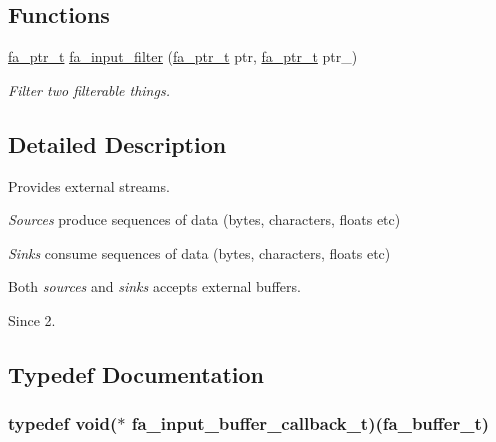 \subsection*{Functions}
\begin{DoxyCompactItemize}
\item 
\hyperlink{group___fa_ga915ddeae99ad7568b273d2b876425197}{fa\-\_\-ptr\-\_\-t} \hyperlink{group___fa_input_ga37bc671f36c95f15fba9aac955990e5e}{fa\-\_\-input\-\_\-filter} (\hyperlink{group___fa_ga915ddeae99ad7568b273d2b876425197}{fa\-\_\-ptr\-\_\-t} ptr, \hyperlink{group___fa_ga915ddeae99ad7568b273d2b876425197}{fa\-\_\-ptr\-\_\-t} ptr\-\_\-)
\begin{DoxyCompactList}\small\item\em Filter two filterable things. \end{DoxyCompactList}\end{DoxyCompactItemize}


\subsection{Detailed Description}
Provides external streams. 
\begin{DoxyItemize}
\item {\itshape Sources} produce sequences of data (bytes, characters, floats etc)
\item {\itshape Sinks} consume sequences of data (bytes, characters, floats etc)
\item Both {\itshape sources} and {\itshape sinks} accepts external buffers.
\end{DoxyItemize}

\begin{DoxySince}{Since}
2. 
\end{DoxySince}


\subsection{Typedef Documentation}
\hypertarget{group___fa_input_gac28594faa4f5b9d2815a4dda56634282}{
\subsubsection[{fa\-\_\-input\-\_\-buffer\-\_\-callback\-\_\-t}]{\setlength{\rightskip}{0pt plus 5cm}typedef void($\ast$  fa\-\_\-input\-\_\-buffer\-\_\-callback\-\_\-t)({\bf fa\-\_\-buffer\-\_\-t})}}\label{group___fa_input_gac28594faa4f5b9d2815a4dda56634282}



